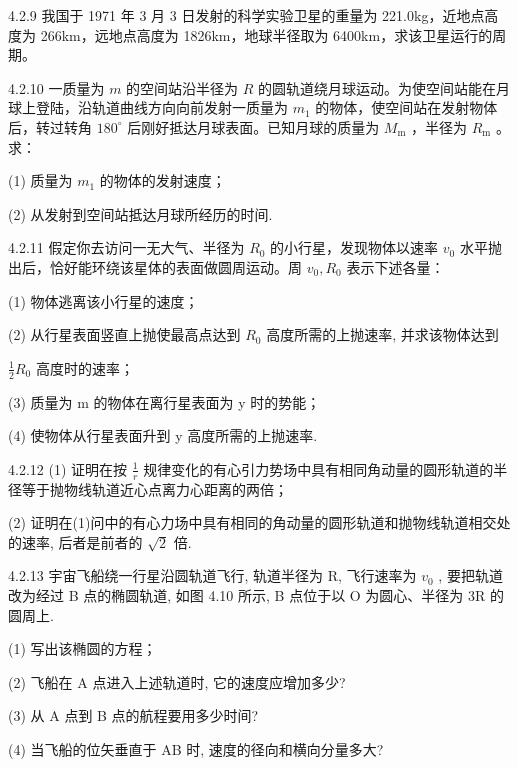 \begin{problem}{4.2.9}
我国于 1971 年 3 月 3 日发射的科学实验卫星的重量为 221.0kg，近地点高度为 266km，远地点高度为 1826km，地球半径取为 6400km，求该卫星运行的周期。
\end{problem}
\clearpage


\begin{problem}{4.2.10}
一质量为 $m$ 的空间站沿半径为 $R$ 的圆轨道绕月球运动。为使空间站能在月球上登陆，沿轨道曲线方向向前发射一质量为 $m_{1}$ 的物体，使空间站在发射物体后，转过转角 $180^{\circ}$ 后刚好抵达月球表面。已知月球的质量为 $M_{\mathrm{m}}$ ，半径为 $R_{\mathrm{m}}$ 。求：

(1) 质量为 $m_{1}$ 的物体的发射速度；

(2) 从发射到空间站抵达月球所经历的时间.
\end{problem}
\clearpage


\begin{problem}{4.2.11}
假定你去访问一无大气、半径为 $R_0$ 的小行星，发现物体以速率 $v_0$ 水平抛出后，恰好能环绕该星体的表面做圆周运动。周 $v_0, R_0$ 表示下述各量：

(1) 物体逃离该小行星的速度；

(2) 从行星表面竖直上抛使最高点达到 $R_{0}$ 高度所需的上抛速率, 并求该物体达到

$\frac{1}{2} R_0$ 高度时的速率；

(3) 质量为 m 的物体在离行星表面为 y 时的势能；

(4) 使物体从行星表面升到 y 高度所需的上抛速率.
\end{problem}
\clearpage


\begin{problem}{4.2.12}
(1) 证明在按 $\frac{1}{r}$ 规律变化的有心引力势场中具有相同角动量的圆形轨道的半径等于抛物线轨道近心点离力心距离的两倍；

(2) 证明在(1)问中的有心力场中具有相同的角动量的圆形轨道和抛物线轨道相交处的速率, 后者是前者的 $\sqrt{2}$ 倍.
\end{problem}
\clearpage


\begin{problem}{4.2.13}
宇宙飞船绕一行星沿圆轨道飞行, 轨道半径为 R, 飞行速率为 $v_{0}$ , 要把轨道改为经过 B 点的椭圆轨道, 如图 4.10 所示, B 点位于以 O 为圆心、半径为 3R 的圆周上.

(1) 写出该椭圆的方程；

(2) 飞船在 A 点进入上述轨道时, 它的速度应增加多少?

(3) 从 A 点到 B 点的航程要用多少时间?

(4) 当飞船的位矢垂直于 AB 时, 速度的径向和横向分量多大?
\begin{center}

\end{center}
\end{problem}
\clearpage


